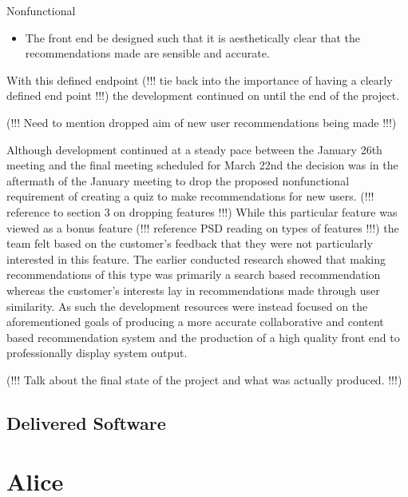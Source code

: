 \documentclass{l3proj}
\begin{document}
Nonfunctional
\begin{itemize}
\item The front end be designed such that it is aesthetically clear that the recommendations made are sensible and accurate.
\end{itemize}

With this defined endpoint  (!!! tie back into the importance of having a clearly defined end point !!!) the development continued on until the end of the project.

(!!! Need to mention dropped aim of new user recommendations being made !!!)

Although development continued at a steady pace between the January 26th meeting and the final meeting scheduled for March 22nd the decision was in the aftermath of the January meeting to drop the proposed nonfunctional requirement of creating a quiz to make recommendations for new users. (!!! reference to section 3 on dropping features !!!) While this particular feature was viewed as a bonus feature (!!! reference PSD reading on types of features !!!) the team felt based on the customer’s feedback that they were not particularly interested in this feature. The earlier conducted research showed that making recommendations of this type was primarily a search based recommendation whereas the customer’s interests lay in recommendations made through user similarity. As such the development resources were instead focused on the aforementioned goals of producing a more accurate collaborative and content based recommendation system and the production of a high quality front end to professionally display system output. 

(!!! Talk about the final state of the project and what was actually produced. !!!)

\subsection{Delivered Software}
\label{finsoftware}

\newpage

\section{Alice}
\label{sec:alice}
\end{document}
